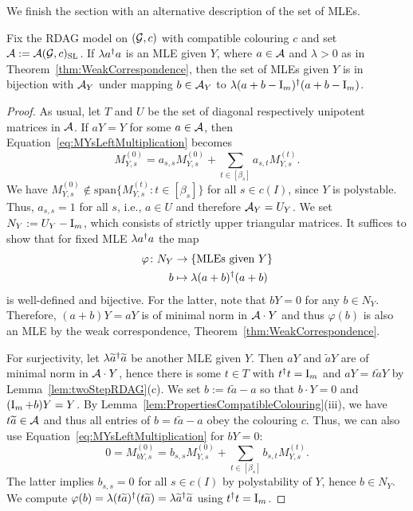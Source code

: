 We finish the section with an alternative description of the set of MLEs.

\begin{prop} \label{prop:RDAGsecond-bijection}
	Fix the RDAG model on $(\mathcal{G}, c)$ with compatible colouring $c$ and set $\mathcal{A} := \mathcal{A}(\mathcal{G}, c)_{\operatorname{SL}}$. If $\lambda a^{\dagger} a$ is an MLE given $Y$, where $a \in \mathcal{A}$ and $\lambda > 0$ as in Theorem~\ref{thm:WeakCorrespondence}, then the set of MLEs given $Y$ is in bijection with $\mathcal{A}_Y$ under mapping $b \in \mathcal{A}_Y$ to $\lambda (a + b - \operatorname{I}_m)^{\dagger} (a + b - \operatorname{I}_m)$.
\end{prop}


\begin{proof}
	As usual, let $T$ and $U$ be the set of diagonal respectively unipotent matrices in $\mathcal{A}$.
	If $aY = Y$ for some $a \in \mathcal{A}$, then Equation~\eqref{eq:MYsLeftMultiplication} becomes
		\[ M_{Y,s}^{(0)} = a_{s,s} M_{Y,s}^{(0)} + \sum_{t \in [\beta_s]} a_{s,t} M_{Y,s}^{(t)}. \]
	We have $M_{Y,s}^{(0)} \notin \mathrm{span} \big\lbrace M_{Y,s}^{(t)} \colon t \in [\beta_s] \big\rbrace$ for all $s \in c(I)$, since $Y$ is polystable. Thus, $a_{s,s} = 1$ for all $s$, i.e., $a \in U$ and therefore $\mathcal{A}_Y = U_Y$. We set $N_Y := U_Y -\operatorname{I}_m$, which consists of strictly upper triangular matrices. It suffices to show that for fixed MLE $\lambda a^{\dagger} a$ the map
	\begin{align*}
		\varphi \colon N_Y &\to \{ \text{MLEs given } Y \} \\
		b &\mapsto \lambda (a + b)^{\dagger} (a + b)
	\end{align*}
	is well-defined and bijective. For the latter, note that $bY = 0$ for any $b \in N_Y$. Therefore, $(a + b)Y = aY$ is of minimal norm in $\mathcal{A} \cdot Y$ and thus $\varphi(b)$ is also an MLE by the weak correspondence, Theorem~\ref{thm:WeakCorrespondence}.
	
	For surjectivity, let $\lambda \widetilde{a}^{\dagger} \widetilde{a}$ be another MLE given $Y$. Then $aY$ and $\widetilde{a} Y$ are of minimal norm in $\mathcal{A} \cdot Y$, hence there is some $t \in T$ with $t^{\dagger} t = \operatorname{I}_m$ and $aY = t\widetilde{a}Y$ by Lemma~\ref{lem:twoStepRDAG}(c). We set $b := t \widetilde{a} - a$ so that $b \cdot Y = 0$ and $(\operatorname{I}_m + b)Y = Y$. By Lemma~\ref{lem:PropertiesCompatibleColouring}(iii), we have $t \widetilde{a} \in \mathcal{A}$ and thus all entries of $b = t \widetilde{a} - a$ obey the colouring $c$. Thus, we can also use Equation~\eqref{eq:MYsLeftMultiplication} for $bY = 0$:
		\[ 0 = M_{bY,s}^{(0)} = b_{s,s} M_{Y,s}^{(0)} + \sum_{t \in [\beta_s]} b_{s,t} M_{Y,s}^{(t)}. \]
	The latter implies $b_{s,s} = 0$ for all $s \in c(I)$ by polystability of $Y$, hence $b \in N_Y$. We compute $\varphi(b) = \lambda (t\widetilde{a})^{\dagger} (t \widetilde{a}) = \lambda \widetilde{a}^{\dagger} \widetilde{a}$ using $t^{\dagger} t = \operatorname{I}_m$.
	

\end{proof}
